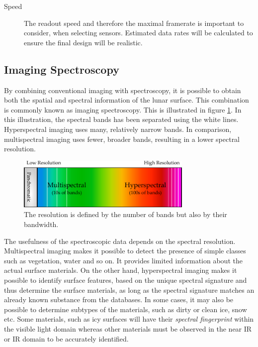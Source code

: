 \begin{description}
\item[Speed] The readout speed and therefore the maximal framerate is important to consider, when selecting sensors. Estimated data rates will be calculated to ensure the final design will be realistic.
\end{description}
\subsection{Imaging Spectroscopy}\label{sec:imaging_spectroscopy}
By combining conventional imaging with spectroscopy, it is possible to obtain both the spatial and spectral information of the lunar surface. This combination is commonly known as imaging spectroscopy. This is illustrated in figure \ref{fig:spectral_information}. In this illustration, the spectral bands has been separated using the white lines. Hyperspectral imaging uses many, relatively narrow bands. In comparison, multispectral imaging uses fewer, broader bands, resulting in a lower spectral resolution. 
\begin{figure}[htb!]
\centering
\includegraphics[width=0.75\textwidth]{figures/Orbiter/spectral_information}
\caption{The resolution is defined by the number of bands but also by their bandwidth.}
\label{fig:spectral_information}
\end{figure}
The usefulness of the spectroscopic data depends on the spectral resolution\cite{elowitz2016}. Multispectral imaging makes it possible to detect the presence of simple classes such as vegetation, water and so on. It provides limited information about the actual surface materials. On the other hand, hyperspectral imaging makes it possible to identify surface features, based on the unique spectral signature and thus determine the surface materials, as long as the spectral signature matches an already known substance from the databases. In some cases, it may also be possible to determine subtypes of the materials, such as dirty or clean ice, snow etc\cite{naegeli2015a}. Some materials, such as icy surfaces will have their \textit{spectral fingerprint} within the visible light domain whereas other materials must be observed in the near IR or IR domain to be accurately identified.

